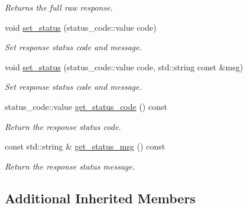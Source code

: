 \begin{DoxyCompactItemize}
\begin{DoxyCompactList}\small\item\em Returns the full raw response. \end{DoxyCompactList}\item 
void \hyperlink{classwebsocketpp_1_1http_1_1parser_1_1response_a2576fc301cc6798d5a830298188b4832}{set\+\_\+status} (status\+\_\+code\+::value code)
\begin{DoxyCompactList}\small\item\em Set response status code and message. \end{DoxyCompactList}\item 
void \hyperlink{classwebsocketpp_1_1http_1_1parser_1_1response_ab673f0371af7934e8abb6946a2952f57}{set\+\_\+status} (status\+\_\+code\+::value code, std\+::string const \&msg)
\begin{DoxyCompactList}\small\item\em Set response status code and message. \end{DoxyCompactList}\item 
status\+\_\+code\+::value \hyperlink{classwebsocketpp_1_1http_1_1parser_1_1response_ae604a1d8f8c26d7e71c42c9373deeec5}{get\+\_\+status\+\_\+code} () const\hypertarget{classwebsocketpp_1_1http_1_1parser_1_1response_ae604a1d8f8c26d7e71c42c9373deeec5}{}\label{classwebsocketpp_1_1http_1_1parser_1_1response_ae604a1d8f8c26d7e71c42c9373deeec5}

\begin{DoxyCompactList}\small\item\em Return the response status code. \end{DoxyCompactList}\item 
const std\+::string \& \hyperlink{classwebsocketpp_1_1http_1_1parser_1_1response_a587122c52c13474c3c79835b7c1e8854}{get\+\_\+status\+\_\+msg} () const\hypertarget{classwebsocketpp_1_1http_1_1parser_1_1response_a587122c52c13474c3c79835b7c1e8854}{}\label{classwebsocketpp_1_1http_1_1parser_1_1response_a587122c52c13474c3c79835b7c1e8854}

\begin{DoxyCompactList}\small\item\em Return the response status message. \end{DoxyCompactList}\end{DoxyCompactItemize}
\subsection*{Additional Inherited Members}


